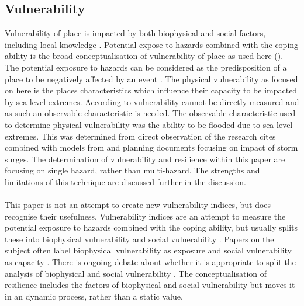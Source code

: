 \subsection{Vulnerability}
Vulnerability of place is impacted by both biophysical and social factors, including local knowledge \cite{opach_seeking_2020}.  Potential expose to hazards combined with the coping ability is the broad conceptualisation of vulnerability of place as used here (\cite{rygel_method_2006}). The potential exposure to hazards can be considered as the predisposition of a place to be negatively affected by an event \cite{lujala_quantifying_2014}. The physical vulnerability as focused on here is the places characteristics which influence their capacity to be impacted by sea level extremes. According to \cite{rod_integrated_2012} vulnerability cannot be directly measured and as such an observable characteristic is needed.  The observable characteristic used to determine physical vulnerability was the ability to be flooded due to sea level extremes. This was determined from direct observation of the research cites combined with models from \cite{kartverket_se_2020} and planning documents focusing on impact of storm surges\cite{miljoenheten_og_byplankontoret_trondheim_kommune_9-notat-om-havnivastigning-og-stormflo---hensyn-i-arealplanlegging-nyhavnapdf_2020}. The determination of vulnerability and resilience within this paper are focusing on single hazard, rather than multi-hazard. The strengths and limitations of this technique are discussed further in the discussion. 
\paragraph{}
This paper is not an attempt to create new vulnerability indices, but does recognise their usefulness. Vulnerability indices are an attempt to measure the potential exposure to hazards combined with the coping ability, but usually splits these into biophysical vulnerability  and social vulnerability \cite{rod_integrated_2012}. Papers on the subject often label biophysical vulnerability as exposure and social vulnerability as capacity \cite{rod_integrated_2012}. There is ongoing debate about whether it is appropriate to split the analysis of biophysical and social vulnerability \cite{lujala_quantifying_2014}. The conceptualisation of resilience includes the factors of biophysical and social vulnerability but moves it in an dynamic process, rather than a static value.

